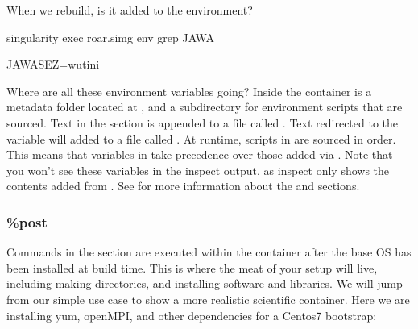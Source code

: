\documentclass[letterpaper,10pt,english]{sphinxmanual}
\begin{document}
When we rebuild, is it added to the environment?

%
\begin{sphinxVerbatim}[commandchars=\\\{\}]
singularity exec roar.simg env \textbar{} grep JAWA

JAWA\PYGZus{}SEZ=wutini
\end{sphinxVerbatim}

Where are all these environment variables going? Inside the container
is a metadata folder located at , and a subdirectory  for environment
scripts that are sourced. Text in the  section is appended to a file
called . Text redirected to the  variable will added to a file called .
At runtime, scripts in  are sourced in order. This means that variables
in  take precedence over those added via . Note that you won’t see
these variables in the inspect output, as inspect only shows the
contents added from .
See {\hyperref[\detokenize{environment_and_metadata:environment-and-metadata}]{}} for more information about
the  and  sections.


\subsubsection{\%post}
\label{\detokenize{container_recipes:post}}
Commands in the  section are executed within the container after the base
OS has been installed at build time. This is where the meat of your
setup will live, including making directories, and installing software
and libraries. We will jump from our simple use case to show a more
realistic scientific container. Here we are installing yum, openMPI, and
other dependencies for a Centos7 bootstrap:
\end{document}
